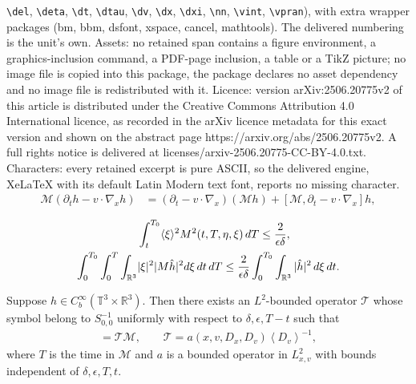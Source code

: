 \documentclass[10pt,a4paper]{amsart}
\newcommand{\CalM}{\mathcal{M}}
\newcommand{\CalT}{\mathcal{T}}
\newcommand{\Eps}{\epsilon}
\newcommand{\R}{\mathbb R}
\newcommand{\T}{\mathbb{T}}
\newcommand{\dT}{\, {\rm d} T}
\newcommand{\dt}{\, {\rm d} t}
\newcommand{\dxi}{\, {\rm d} \xi}
\newcommand{\vint}[1]{\left\langle#1\right\rangle}
\newcommand{\vpran}[1]{\left(#1\right)}
\begin{document}
\texttt{\textbackslash del}, \texttt{\textbackslash deta}, \texttt{\textbackslash dt}, \texttt{\textbackslash dtau}, \texttt{\textbackslash dv}, \texttt{\textbackslash dx}, \texttt{\textbackslash dxi}, \texttt{\textbackslash nn}, \texttt{\textbackslash vint}, \texttt{\textbackslash vpran}), with extra wrapper packages (bm, bbm, dsfont, xspace, cancel, mathtools). The delivered numbering is the unit's own. Assets: no retained span contains a figure environment, a graphics-inclusion command, a PDF-page inclusion, a table or a TikZ picture; no image file is copied into this package, the package declares no asset dependency and no image file is redistributed with it. Licence: version arXiv:2506.20775v2 of this article is distributed under the Creative Commons Attribution 4.0 International licence, as recorded in the arXiv licence metadata for this exact version and shown on the abstract page https://arxiv.org/abs/2506.20775v2. A full rights notice is delivered at licenses/arxiv-2506.20775-CC-BY-4.0.txt. Characters: every retained excerpt is pure ASCII, so the delivered engine, XeLaTeX with its default Latin Modern text font, reports no missing character.
\begin{align}
{\CalM} (\partial_t  h   -v \cdot \nabla_x   h)  
& = \vpran{\partial_t - v \cdot \nabla_x } ({\CalM} h) + [\CalM, \partial_t - v \cdot \nabla_x ]h,\label{trasp_comm}
\end{align}

\begin{align}
 & \int_t^{T_0}  \langle \xi \rangle ^2 {M}^2(t,T, \eta,\xi)  \dT 
\le    
 \frac{2}{\Eps \delta}, \label{int_xi_M2}
\\
 \int_0^{T_0}  \int_0^{T}  \int_{\R^3}  &|\xi|^2 | {M} \hat{h}| ^2d\xi  \dt \dT \le \frac{2}{\Eps \delta} \int_0^{T_0} \int_{\R^3} | \hat{h} |^2  \dxi \dt.  \label{lapl}
\end{align}

\begin{lemma} \label{lem:M-comm-x-v}
Suppose $h \in C^\infty_b(\T^3 \times \R^3)$. Then there exists an $L^2$-bounded operator $\CalT$ whose symbol belong
to $S^{-1}_{0,0}$ uniformly with respect to $\delta, \Eps, T-t$
such that 
\begin{align*}
 [\CalM, h] = \CalT \CalM,
\qquad
\CalT = a(x, v, D_x, D_v) \vint{D_v}^{-1},
\end{align*}
where $T$ is the time in $\CalM$ and $a$ is a bounded operator in $L^2_{x,v}$ with bounds independent of $\delta, \epsilon, T, t$.
\end{lemma}
\end{document}
